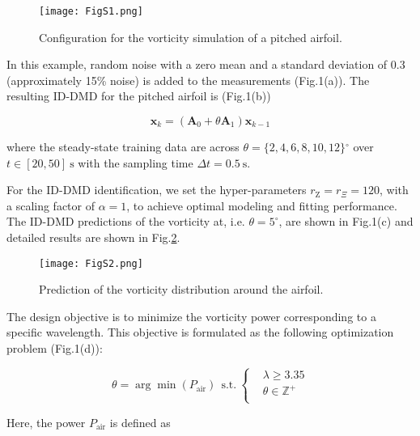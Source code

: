 \begin{figure}[!htb]
  \centering
  \texttt{[image: FigS1.png]}
  \caption{
 Configuration for the vorticity simulation of a pitched airfoil.
  }
  \label{S1}
\end{figure}

In this example, random noise with a zero mean and a standard deviation of 0.3 (approximately 15\% noise) is added to the measurements (Fig.1(a)). The resulting ID-DMD for the pitched airfoil is (Fig.1(b))

\begin{equation}
    \mathbf{x}_{k}=(\mathbf{A}_{0}+\theta {\mathbf{A}_{1}}){\mathbf{x}_{k-1}} \label{eqS18}
\end{equation}

\noindent where the steady-state training data are across $\theta =\{2, 4, 6, 8, 10, 12\}{}^\circ$ over $t\in [20,50]\ \text{s}$ with the sampling time $\Delta t=0.5\ \text{s}$.

For the ID-DMD identification, we set the hyper-parameters ${r}_{\text{Z}}={r}_{\Xi}=120$, with a scaling factor of $\alpha =1$, to achieve optimal modeling and fitting performance. The ID-DMD predictions of the vorticity at, i.e. $\theta =5^\circ$, are shown in Fig.1(c) and detailed results are shown in Fig.\ref{S2}.

\begin{figure}[!htb]
  \centering
  \texttt{[image: FigS2.png]}
  \caption{
  Prediction of the vorticity distribution around the airfoil.
  }
  \label{S2}
\end{figure}

The design objective is to minimize the vorticity power corresponding to a specific wavelength. This objective is formulated as the following optimization problem (Fig.1(d)): 

\begin{equation}
    \theta =\arg \min ({P}_\text{air})\ \ \text{s}\text{.t}\text{.}\ \left\{\begin{aligned}
    & \lambda \ge 3.35 \\ 
    & \theta \in {\mathbb{Z}^{+}} \\ 
    \end{aligned} \right. \label{eqS19}
\end{equation}

Here, the power ${P}_\text{air}$ is defined as

